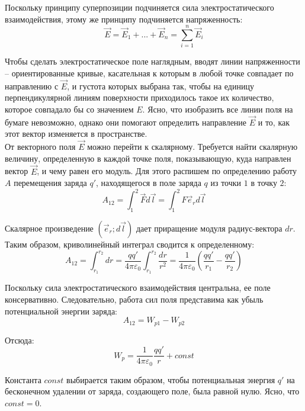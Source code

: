 \documentclass{article}
\begin{document}
	Поскольку принципу суперпозиции подчиняется сила электростатического взаимодействия, этому же принципу подчиняется напряженность:
	\begin{equation}
		\vec E = \vec E_1 + ... + \vec E_n = \sum_{i=1}^n \vec E_i
	\end{equation}

	Чтобы сделать электростатическое поле наглядным, вводят линии напряженности -- ориентированные кривые, касательная к которым в любой точке совпадает по направлению с $\vec E$, и густота которых выбрана так, чтобы на единицу перпендикулярной линиям поверхности приходилось такое их количество, которое совпадало бы со значением $E$. Ясно, что изобразить все линии поля на бумаге невозможно, однако они помогают определить направление $\vec E$ и то, как этот вектор изменяется в пространстве.\\

	От векторного поля $\vec E$ можно перейти к скалярному. Требуется найти скалярную величину, определенную в каждой точке поля, показывающую, куда направлен вектор $\vec E$, и чему равен его модуль. Для этого распишем по определению работу $A$ перемещения заряда $q'$, находящегося в поле заряда $q$ из точки $1$ в точку $2$:
	\begin{equation}
		A_{12} = \int_1^2 \vec Fd\vec l = \int_1^2 F\vec e_r d\vec l
	\end{equation}

	Скалярное произведение $(\vec e_r; d\vec l)$ дает приращение модуля радиус-вектора $dr$. Таким образом, криволинейный интеграл сводится к определенному:
	\begin{equation}
		A_{12} = \int_{r_1}^{r_2} dr = \frac{qq'}{4\pi\varepsilon_0}\int_{r_1}^{r_2}\frac{dr}{r^2} = \frac{1}{4\pi\varepsilon_0}(\frac{qq'}{r_1}-\frac{qq'}{r_2})
	\end{equation}

	Поскольку сила электростатического взаимодействия центральна, ее поле консервативно. Следовательно, работа сил поля представима как убыль потенциальной энергии заряда:
	\begin{equation}
		A_{12} = W_{p1} - W_{p2}
	\end{equation}

	Отсюда:
	\begin{equation}
		W_{p} = \frac{1}{4\pi\varepsilon_0}\frac{qq'}{r} + const
	\end{equation}

	Константа $const$ выбирается таким образом, чтобы потенциальная энергия $q'$ на бесконечном удалении от заряда, создающего поле, была равной нулю. Ясно, что $const=0$.\\
\end{document}

